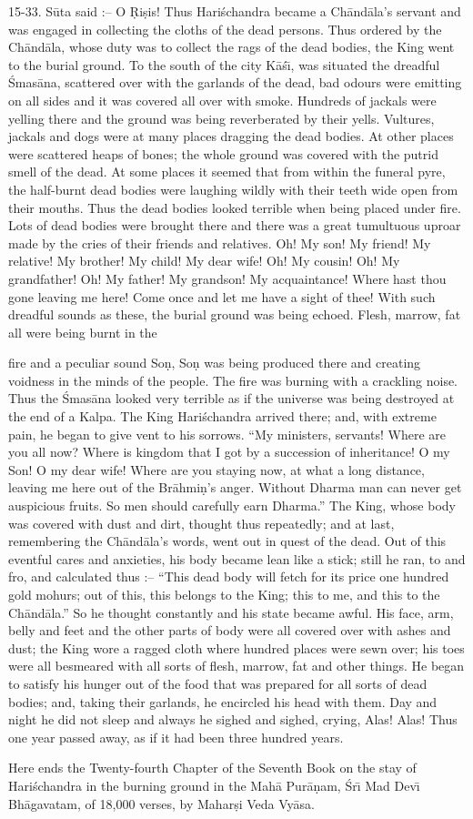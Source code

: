 15-33. S\=uta said :-- O \d{R}i\d{s}is! Thus Hari\'schandra became a Ch\=and\=ala's servant and was engaged in collecting the cloths of the dead persons. Thus ordered by the Ch\=and\=ala, whose duty was to collect the rags of the dead bodies, the King went to the burial ground. To the south of the city K\=a\'s\={\i}, was situated the dreadful \'Smas\=ana, scattered over with the garlands of the dead, bad odours were emitting on all sides and it was covered all over with smoke. Hundreds of jackals were yelling there and the ground was being reverberated by their yells. Vultures, jackals and dogs were at many places dragging the dead bodies. At other places were scattered heaps of bones; the whole ground was covered with the putrid smell of the dead. At some places it seemed that from within the funeral pyre, the half-burnt dead bodies were laughing wildly with their teeth wide open from their mouths. Thus the dead bodies looked terrible when being placed under fire. Lots of dead bodies were brought there and there was a great tumultuous uproar made by the cries of their friends and relatives. Oh! My son! My friend! My relative! My brother! My child! My dear wife! Oh! My cousin! Oh! My grandfather! Oh! My father! My grandson! My acquaintance! Where hast thou gone leaving me here! Come once and let me have a sight of thee! With such dreadful sounds as these, the burial ground was being echoed. Flesh, marrow, fat all were being burnt in the

fire and a peculiar sound So\d{n}, So\d{n} was being produced there and creating voidness in the minds of the people. The fire was burning with a crackling noise. Thus the \'Smas\=ana looked very terrible as if the universe was being destroyed at the end of a Kalpa. The King Hari\'schandra arrived there; and, with extreme pain, he began to give vent to his sorrows. ``My ministers, servants! Where are you all now? Where is kingdom that I got by a succession of inheritance! O my Son! O my dear wife! Where are you staying now, at what a long distance, leaving me here out of the Br\=ahmi\d{n}'s anger. Without Dharma man can never get auspicious fruits. So men should carefully earn Dharma.'' The King, whose body was covered with dust and dirt, thought thus repeatedly; and at last, remembering the Ch\=and\=ala's words, went out in quest of the dead. Out of this eventful cares and anxieties, his body became lean like a stick; still he ran, to and fro, and calculated thus :-- ``This dead body will fetch for its price one hundred gold mohurs; out of this, this belongs to the King; this to me, and this to the Ch\=and\=ala.'' So he thought constantly and his state became awful. His face, arm, belly and feet and the other parts of body were all covered over with ashes and dust; the King wore a ragged cloth where hundred places were sewn over; his toes were all besmeared with all sorts of flesh, marrow, fat and other things. He began to satisfy his hunger out of the food that was prepared for all sorts of dead bodies; and, taking their garlands, he encircled his head with them. Day and night he did not sleep and always he sighed and sighed, crying, Alas! Alas! Thus one year passed away, as if it had been three hundred years.

Here ends the Twenty-fourth Chapter of the Seventh Book on the stay of Hari\'schandra in the burning ground in the Mah\=a Pur\=a\d{n}am, \'Sr\={\i} Mad Dev\={\i} Bh\=agavatam, of 18,000 verses, by Mahar\d{s}i Veda Vy\=asa.



